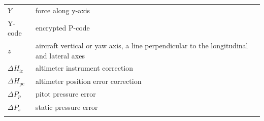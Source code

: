 \documentclass[
]{book}
\begin{document}
\begin{longtable}[]{@{}ll@{}}
\begin{minipage}[t]{0.47\columnwidth}\raggedright
\(Y\)\strut
\end{minipage} & \begin{minipage}[t]{0.47\columnwidth}\raggedright
force along y-axis\strut
\end{minipage}\tabularnewline
\begin{minipage}[t]{0.47\columnwidth}\raggedright
Y-code\strut
\end{minipage} & \begin{minipage}[t]{0.47\columnwidth}\raggedright
encrypted P-code\strut
\end{minipage}\tabularnewline
\begin{minipage}[t]{0.47\columnwidth}\raggedright
\(z\)\strut
\end{minipage} & \begin{minipage}[t]{0.47\columnwidth}\raggedright
aircraft vertical or yaw axis, a line perpendicular to the longitudinal and lateral axes\strut
\end{minipage}\tabularnewline
\begin{minipage}[t]{0.47\columnwidth}\raggedright
\(\Delta H_{\mathrm{ic}}\)\strut
\end{minipage} & \begin{minipage}[t]{0.47\columnwidth}\raggedright
altimeter instrument correction\strut
\end{minipage}\tabularnewline
\begin{minipage}[t]{0.47\columnwidth}\raggedright
\(\Delta H_{\mathrm{pc}}\)\strut
\end{minipage} & \begin{minipage}[t]{0.47\columnwidth}\raggedright
altimeter position error correction\strut
\end{minipage}\tabularnewline
\begin{minipage}[t]{0.47\columnwidth}\raggedright
\(\Delta P_{p}\)\strut
\end{minipage} & \begin{minipage}[t]{0.47\columnwidth}\raggedright
pitot pressure error\strut
\end{minipage}\tabularnewline
\begin{minipage}[t]{0.47\columnwidth}\raggedright
\(\Delta P_{s}\)\strut
\end{minipage} & \begin{minipage}[t]{0.47\columnwidth}\raggedright
static pressure error\strut
\end{minipage}\tabularnewline
\begin{minipage}[t]{0.47\columnwidth}\raggedright

\end{minipage}
\end{longtable}
\end{document}
